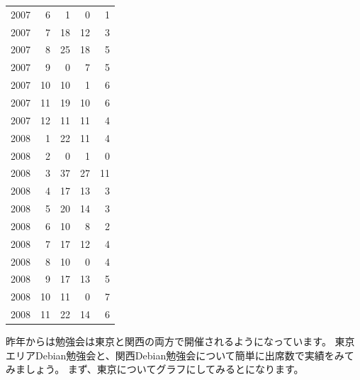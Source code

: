 \documentclass[mingoth,a4paper]{jsarticle}
\begin{document}
\begin{table}[ht]
\begin{minipage}{0.5\hsize}
\begin{tabular}{|l|r|r|r|r|}
 2007 & 6 & 1 & 0 & 1\\
 2007 & 7 & 18 & 12 & 3\\
 2007 & 8 & 25 & 18 & 5\\
 2007 & 9 & 0 & 7 & 5\\
 2007 & 10 & 10 & 1 & 6\\
 2007 & 11 & 19 & 10 & 6\\
 2007 & 12 & 11 & 11 & 4\\
 2008 & 1 & 22 & 11 & 4\\
 2008 & 2 & 0 & 1 & 0\\
 2008 & 3 & 37 & 27 & 11\\
 2008 & 4 & 17 & 13 & 3\\
 2008 & 5 & 20 & 14 & 3\\
 2008 & 6 & 10 & 8 & 2\\
 2008 & 7 & 17 & 12 & 4\\
 2008 & 8 & 10 & 0 & 4\\
 2008 & 9 & 17 & 13 & 5\\
 2008 & 10 & 11 & 0 & 7\\
 2008 & 11 & 22 & 14 & 6\\
\end{tabular}
\end{minipage}

\end{table}

昨年からは勉強会は東京と関西の両方で開催されるようになっています。
東京エリアDebian勉強会と、関西Debian勉強会について簡単に出席数で実績をみてみましょう。
まず、東京についてグラフにしてみるとになります。
\end{document}
